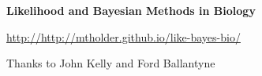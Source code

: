 \documentclass[landscape]{foils}
\begin{document}
\unitlength=1mm

\begin{center}
{\Large {\bf Likelihood and Bayesian Methods in Biology}}\\
\vskip 5mm
{\large
\url{http://http://mtholder.github.io/like-bayes-bio/}\par
\large Thanks to John Kelly and Ford Ballantyne
}
\end{center}
\end{document}
